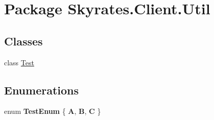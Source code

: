 \hypertarget{namespace_skyrates_1_1_client_1_1_util}{\section{Package Skyrates.\-Client.\-Util}
\label{namespace_skyrates_1_1_client_1_1_util}
}
\subsection*{Classes}
\begin{DoxyCompactItemize}
\item 
class \hyperlink{class_skyrates_1_1_client_1_1_util_1_1_test}{Test}
\end{DoxyCompactItemize}
\subsection*{Enumerations}
\begin{DoxyCompactItemize}
\item 
enum {\bfseries Test\-Enum} \{ {\bfseries A}, 
{\bfseries B}, 
{\bfseries C}
 \}
\end{DoxyCompactItemize}

